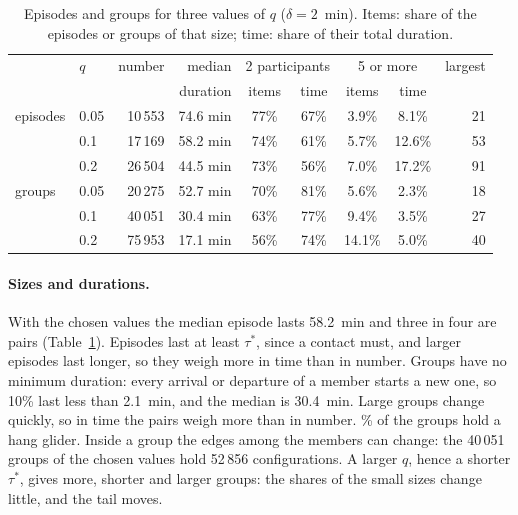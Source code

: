 \begin{table}
\centering
\small
\begin{tabular}{@{}l l r r c c c c r@{}}
\toprule
& $q$ & number & median & \multicolumn{2}{c}{2 participants} & \multicolumn{2}{c}{5 or more} & largest \\
& & & duration & items & time & items & time & \\
\midrule
episodes & 0.05 & 10\,553 & 74.6 min & 77\% & 67\% & 3.9\% & 8.1\% & 21 \\
 & 0.1 & 17\,169 & 58.2 min & 74\% & 61\% & 5.7\% & 12.6\% & 53 \\
 & 0.2 & 26\,504 & 44.5 min & 73\% & 56\% & 7.0\% & 17.2\% & 91 \\
\midrule
groups & 0.05 & 20\,275 & 52.7 min & 70\% & 81\% & 5.6\% & 2.3\% & 18 \\
 & 0.1 & 40\,051 & 30.4 min & 63\% & 77\% & 9.4\% & 3.5\% & 27 \\
 & 0.2 & 75\,953 & 17.1 min & 56\% & 74\% & 14.1\% & 5.0\% & 40 \\
\bottomrule
\end{tabular}
\caption{Episodes and groups for three values of $q$ ($\delta=2$~min). Items: share of the
episodes or groups of that size; time: share of their total duration.}
\label{tab:structure}
\end{table}

\paragraph{Sizes and durations.} With the chosen values the median episode lasts 58.2~min and three
in four are pairs (Table~\ref{tab:structure}). Episodes last at least $\tau^*$, since a contact
must, and larger episodes last longer, so they weigh more in time than in number. Groups have no
minimum duration: every arrival or departure of a member starts a new one, so 10\% last less
than 2.1~min, and the median is 30.4~min. Large groups change quickly, so in time the pairs weigh
more than in number. \StWithHang\% of the groups hold a hang glider. Inside a group the edges
among the members can change: the 40\,051 groups of the chosen values hold 52\,856
configurations. A larger $q$, hence a shorter $\tau^*$, gives more, shorter and larger groups:
the shares of the small sizes change little, and the tail moves.

